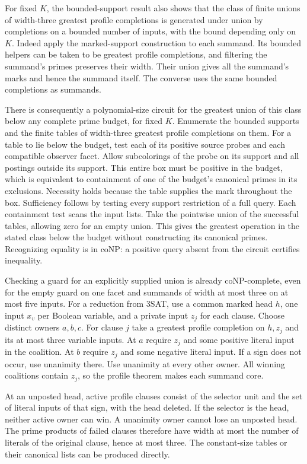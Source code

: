 For fixed $K$, the bounded-support result also shows
that the class of finite unions of width-three
greatest profile completions is generated under union by
completions on a bounded number of inputs, with the bound
depending only on $K$. Indeed apply the marked-support
construction to each summand. Its bounded helpers can be
taken to be greatest profile completions, and filtering
the summand's primes preserves their width. Their union gives
all the summand's marks and hence the summand itself. The
converse uses the same bounded completions as summands.

There is consequently a polynomial-size circuit for the
greatest union of this class below any complete prime budget,
for fixed $K$. Enumerate the bounded supports and the finite
tables of width-three greatest profile completions on them.
For a table to lie below the budget, test each of its positive
source probes and each compatible observer facet. Allow
subcolorings of the probe on its support and all postings
outside its support. This entire box must be positive in
the budget, which is equivalent to containment of one of
the budget's canonical primes in its exclusions. Necessity
holds because the table supplies the mark throughout the
box. Sufficiency follows by testing every support restriction
of a full query. Each containment test scans the input lists.
Take the pointwise union of the successful tables, allowing
zero for an empty union. This gives the greatest operation
in the stated class below the budget without constructing
its canonical primes. Recognizing equality is in coNP: a
positive query absent from the circuit certifies inequality.

Checking a guard for an explicitly supplied union is already
coNP-complete, even for the empty guard on one facet and
summands of width at most three on at most five inputs.
For a reduction from 3SAT, use a common marked head $h$, one
input $x_v$ per Boolean variable, and a private input $z_j$
for each clause. Choose distinct owners $a,b,c$. For clause
$j$ take a greatest profile completion on $h,z_j$ and its
at most three variable inputs. At $a$ require $z_j$ and some
positive literal input in the coalition. At $b$ require
$z_j$ and some negative literal input. If a sign does not
occur, use unanimity there. Use unanimity at every other
owner. All winning coalitions contain $z_j$, so the profile
theorem makes each summand core.

At an unposted head, active profile clauses consist of the
selector unit and the set of literal inputs of that sign,
with the head deleted. If the selector is the head, neither
active owner can win. A unanimity owner cannot lose an
unposted head. The prime products of failed clauses therefore
have width at most the number of literals of the original
clause, hence at most three. The constant-size tables or
their canonical lists can be produced directly.

